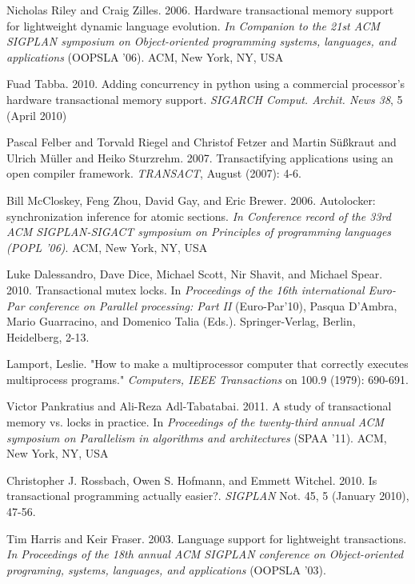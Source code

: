 \documentclass{sigplanconf}
\begin{document}
\begin{thebibliography}{}
  Nicholas Riley and Craig Zilles. 2006. Hardware transactional memory
  support for lightweight dynamic language evolution. \emph{In
    Companion to the 21st ACM SIGPLAN symposium on Object-oriented
    programming systems, languages, and applications} (OOPSLA
  '06). ACM, New York, NY, USA

  Fuad Tabba. 2010. Adding concurrency in python using a commercial
  processor's hardware transactional memory support. \emph{SIGARCH
  Comput. Archit. News 38}, 5 (April 2010)

  Pascal Felber and Torvald Riegel and Christof Fetzer and Martin
  Süßkraut and Ulrich Müller and Heiko Sturzrehm. 2007. Transactifying
  applications using an open compiler framework. \emph{TRANSACT}, August
  (2007): 4-6.

  Bill McCloskey, Feng Zhou, David Gay, and Eric
  Brewer. 2006. Autolocker: synchronization inference for atomic
  sections. \emph{In Conference record of the 33rd ACM SIGPLAN-SIGACT
  symposium on Principles of programming languages (POPL '06)}. ACM,
  New York, NY, USA

  Luke Dalessandro, Dave Dice, Michael Scott, Nir Shavit, and Michael
  Spear. 2010. Transactional mutex locks. In \emph{Proceedings of the
    16th international Euro-Par conference on Parallel processing: Part
    II} (Euro-Par'10), Pasqua D'Ambra, Mario Guarracino, and Domenico
  Talia (Eds.). Springer-Verlag, Berlin, Heidelberg, 2-13.

  Lamport, Leslie. "How to make a multiprocessor computer that
  correctly executes multiprocess programs." \emph{Computers, IEEE
    Transactions} on 100.9 (1979): 690-691.

  Victor Pankratius and Ali-Reza Adl-Tabatabai. 2011. A study of
  transactional memory vs. locks in practice. In \emph{Proceedings of
    the twenty-third annual ACM symposium on Parallelism in algorithms
    and architectures} (SPAA '11). ACM, New York, NY, USA

  Christopher J. Rossbach, Owen S. Hofmann, and Emmett
  Witchel. 2010. Is transactional programming actually
  easier?. \emph{SIGPLAN} Not. 45, 5 (January 2010), 47-56.

  Tim Harris and Keir Fraser. 2003. Language support for lightweight
  transactions. \emph{In Proceedings of the 18th annual ACM SIGPLAN
    conference on Object-oriented programing, systems, languages, and
    applications} (OOPSLA '03).


\end{thebibliography}
\end{document}
